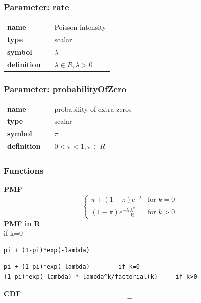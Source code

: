 \subsubsection*{Parameter: rate}

\noindent\begin{tabular}{p{2cm}cl}
\textbf{name} & & Poisson intensity \\
\textbf{type} & & scalar \\
\textbf{symbol} & & $\lambda$  \\
\textbf{definition} & & $\lambda \in R, \lambda > 0$
\end{tabular}
\subsubsection*{Parameter: probabilityOfZero}

\noindent\begin{tabular}{p{2cm}cl}
\textbf{name} & & probability of extra zeros \\
\textbf{type} & & scalar \\
\textbf{symbol} & & $\pi$  \\
\textbf{definition} & & $0<\pi<1, \pi \in  R$
\end{tabular}
\subsubsection*{Functions}

\smallskip \noindent \hspace{.2cm} \textbf{PMF} 
\begin{equation*}\begin{cases}
\pi + (1-\pi) e^{-\lambda}& \text{for } k = 0 \\ 
(1-\pi) e^{-\lambda} \frac{\lambda^k}{k!} & \text{for } k > 0
\end{cases}\end{equation*}
\smallskip \noindent \hspace{.2cm} \textbf{PMF in R}  \\
if k=0 \begin{verbatim}pi + (1-pi)*exp(-lambda) \end{verbatim}
\begin{verbatim}pi + (1-pi)*exp(-lambda) 		if k=0
(1-pi)*exp(-lambda) * lambda^k/factorial(k)  	if k>0\end{verbatim}
\smallskip \noindent \hspace{.2cm} \textbf{CDF} 
\begin{equation*}-\end{equation*}


